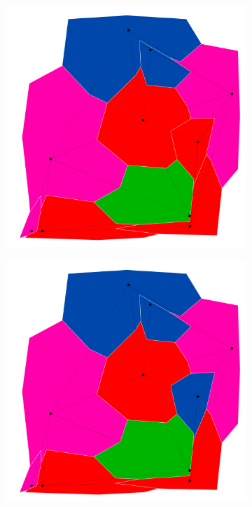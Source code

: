 \documentclass{article}
\begin{document}
				
		\begin{figure}[h!]
			\begin{subfigure}{0.18\textwidth}
				\centering
				\includegraphics[width=\textwidth]{images/sequences/min/minconf_I00003}
				\caption{}
				\label{mina}
			\end{subfigure}
			\;
			\begin{subfigure}{0.18\textwidth}
				\centering
				\includegraphics[width=\textwidth]{images/sequences/min/minconf_I00004}

\end{subfigure}
\end{figure}
\end{document}
